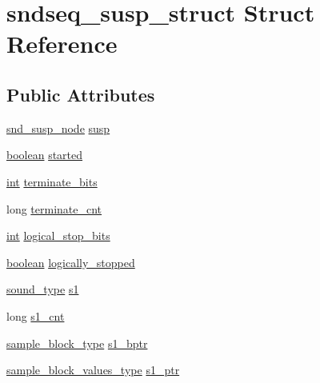 \hypertarget{structsndseq__susp__struct}{}\section{sndseq\+\_\+susp\+\_\+struct Struct Reference}
\label{structsndseq__susp__struct}
\subsection*{Public Attributes}
\begin{DoxyCompactItemize}
\item 
\hyperlink{sound_8h_a6b268203688a934bd798ceb55f85d4c0}{snd\+\_\+susp\+\_\+node} \hyperlink{structsndseq__susp__struct_a3ba88e4bfa6575588f3038e158d17cc3}{susp}
\item 
\hyperlink{cext_8h_a7670a4e8a07d9ebb00411948b0bbf86d}{boolean} \hyperlink{structsndseq__susp__struct_abe212e71f0fffcfd34b50894fba3ba33}{started}
\item 
\hyperlink{xmltok_8h_a5a0d4a5641ce434f1d23533f2b2e6653}{int} \hyperlink{structsndseq__susp__struct_ad5a2331c3f5dd7cc5bc791f2a6d5b494}{terminate\+\_\+bits}
\item 
long \hyperlink{structsndseq__susp__struct_ae69868d363f2288398b0dcc25e249ce3}{terminate\+\_\+cnt}
\item 
\hyperlink{xmltok_8h_a5a0d4a5641ce434f1d23533f2b2e6653}{int} \hyperlink{structsndseq__susp__struct_a5ec192e5b0a58d4f10cf16449885a5f0}{logical\+\_\+stop\+\_\+bits}
\item 
\hyperlink{cext_8h_a7670a4e8a07d9ebb00411948b0bbf86d}{boolean} \hyperlink{structsndseq__susp__struct_adba55e0931a7d924aeda8516bd3cc9d6}{logically\+\_\+stopped}
\item 
\hyperlink{sound_8h_a792cec4ed9d6d636d342d9365ba265ea}{sound\+\_\+type} \hyperlink{structsndseq__susp__struct_ad95ebdf5dc44b8033b18ff4bc8e7ec25}{s1}
\item 
long \hyperlink{structsndseq__susp__struct_a1b4a5072f021520588391fd6ad10dad3}{s1\+\_\+cnt}
\item 
\hyperlink{sound_8h_a6becaef7eb98c0e45b13f72dadf07b23}{sample\+\_\+block\+\_\+type} \hyperlink{structsndseq__susp__struct_ab5bac14310aecd2129e943c8aed7841d}{s1\+\_\+bptr}
\item 
\hyperlink{sound_8h_a83d17f7b465d1591f27cd28fc5eb8a03}{sample\+\_\+block\+\_\+values\+\_\+type} \hyperlink{structsndseq__susp__struct_a6ef4914e875145770733f3e79b54f2d0}{s1\+\_\+ptr}
\item 

\end{DoxyCompactItemize}
